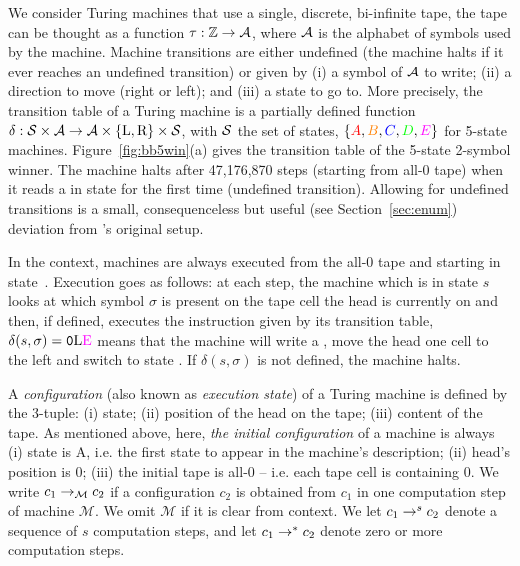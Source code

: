 We consider Turing machines that use a single, discrete, bi-infinite tape, \ie the tape can be thought as a function $\tau: \mathbb{Z} \to \mathcal{A}$, where $\mathcal{A}$ is the alphabet of symbols used by the machine. Machine transitions are either undefined (the machine halts if it ever reaches an undefined transition) or given by (i) a symbol of $\mathcal{A}$ to write; (ii) a direction to move (right or left); and (iii) a state to go to. More precisely, the transition table of a Turing machine is a partially defined function $\delta: \mathcal{S} \times \mathcal{A} \to \mathcal{A} \times \{\text{L},\text{R}\} \times \mathcal{S} $, with $\mathcal{S}$ the set of states, \eg $\{\stateA,\stateB,\stateC,\stateD,\stateE\}$ for 5-state machines. Figure~\ref{fig:bb5win}(a) gives the transition table of the 5-state 2-symbol \BBfull winner. The machine halts after 47,176,870 steps (starting from all-0 tape) when it reads a \szero in state \stateE for the first time (undefined transition). Allowing for undefined transitions is a small, consequenceless but useful (see Section~\ref{sec:enum}) deviation from \rado's original setup.

In the \BBfull context, machines are always executed from the all-0 tape and starting in state~\stateA. Execution goes as follows: at each step, the machine which is in state $s$ looks at which symbol $\sigma$ is present on the tape cell the head is currently on and then, if defined, executes the instruction given by its transition table, \eg $\delta(s, \sigma) = \szero\text{L}\text{\stateE}$ means that the machine will write a \szero, move the head one cell to the left and switch to state \stateE. If $\delta(s, \sigma)$ is not defined, the machine halts.



A \textit{configuration} (also known as \textit{execution state}) of a Turing machine is defined by the 3-tuple: (i) state; (ii) position of the head on the tape; (iii) content of the tape. As mentioned above, here, \textit{the initial configuration} of a machine is always (i) state is A, i.e. the first state to appear in the machine's description; (ii) head's position is 0; (iii) the initial tape is all-0 -- i.e. each tape cell is containing 0. We write $c_1 \to_\mathcal{M} c_2$ if a configuration $c_2$ is obtained from $c_1$ in one computation step of machine $\mathcal{M}$. We omit $\mathcal{M}$ if it is clear from context. We let $c_1 \to^s c_2$ denote a sequence of $s$ computation steps, and let $c_1 \to^* c_2$ denote zero or more computation steps. %


